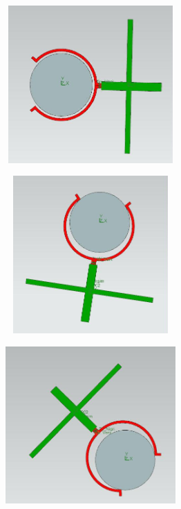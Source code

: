 \documentclass[12pt]{article}
\begin{document}
{\begin{figure}[H]
		\begin{subfigure}{0.19\textwidth}
			\centering\includegraphics[height=6cm,width=1\textwidth,keepaspectratio]{var8_2.jpeg}
			\caption{}
			\label{fig:var8_2.jpeg}
		\end{subfigure}
	\begin{subfigure}{0.19\textwidth}
		\centering\includegraphics[height=6cm,width=1\textwidth,keepaspectratio]{var8_3.jpeg}
		\caption{}
		\label{fig:var8_3.jpeg}
	\end{subfigure}
	\begin{subfigure}{0.19\textwidth}
		\centering\includegraphics[height=6cm,width=1\textwidth,keepaspectratio]{var8_4.jpeg}
		\caption{}
		\label{fig:var8_4.jpeg}
	\end{subfigure}
	\begin{subfigure}{0.19\textwidth}

\end{subfigure}
\end{figure}}
\end{document}
